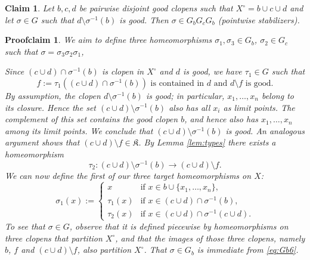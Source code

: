 \documentclass[10pt,a4paper]{amsart}
\newtheorem{claim}{Claim}
\newtheorem{proofclaim}{Proofclaim}
\begin{document}
\begin{claim} \label{cl:GbGcGb}
Let $b,c,d$ be pairwise disjoint good clopens such that $X^\circ=b\cup c\cup d$ and let $\sigma\in G$ such that  
 $d\setminus\sigma^{-1}(b)$ is good.
Then $\sigma\in G_bG_cG_b$ (pointwise stabilizers).
\end{claim}

\begin{proofclaim}
We aim to define three homeomorphisms $\sigma_1,\sigma_3\in G_b$, $\sigma_2\in G_c$ such that
$\sigma=\sigma_3\sigma_2\sigma_1$,

 Since $(c\cup d)\cap \sigma^{-1}(b)$ is clopen in $X^\circ$ and $d$ is good,
 we have $\tau_1\in G$ such that
\begin{equation} \label{eq:Gb1}
 f := \tau_1((c\cup d)\cap \sigma^{-1}(b)) \text{ is contained in } d \text{ and } d\setminus f \text{ is good}.
\end{equation}
By assumption, the clopen $d\setminus \sigma^{-1}(b)$ is good; in particular, $x_1,\dots, x_n$ belong to its closure.
 Hence the set $(c\cup d)\setminus \sigma^{-1}(b)$ also has all $x_i$ as limit points.
 The complement of this set contains the good clopen $b$, and hence also has $x_1,\dots, x_n$ among its
 limit points.
 We conclude that  $(c\cup d)\setminus \sigma^{-1}(b)$ is good.
 An analogous argument shows that $(c\cup d)\setminus f\in \mathfrak{K}$.
By Lemma \ref{lem:types} there exists a homeomorphism
\begin{equation*}
\tau_2 \colon (c\cup d)\setminus\sigma^{-1}(b)\rightarrow (c\cup d)\setminus f.
\end{equation*}
We can now define the first of our three target homeomorphisms on $X$:
\begin{equation}
\label{eq:Gb6}
\sigma_1(x) := 
\begin{cases}
x & \text{if } x\in b \cup \{x_1,\dots,x_n\}, \\
\tau_1(x) & \text{if } x\in (c\cup d)\cap \sigma^{-1}(b),\\
\tau_2(x) & \text{if } x\in (c\cup d)\cap \sigma^{-1}(c\cup d).
\end{cases}
\end{equation}
To see that $\sigma\in G$, observe that it is defined piecewise by homeomorphisms on three clopens that partition $X^\circ$,
and that the images of those three clopens, namely $b$, $f$ and $(c\cup d)\setminus f$,
also partition $X^\circ$. That $\sigma\in G_b$ is immediate from \eqref{eq:Gb6}.


\end{proofclaim}
\end{document}
